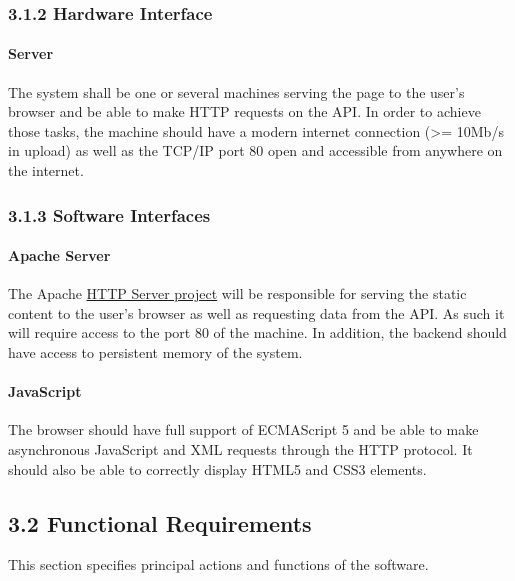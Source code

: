 \documentclass[]{article}
\begin{document}
\subsubsection{3.1.2 Hardware Interface}\label{hardware-interface}

\paragraph{Server}\label{server}

The system shall be one or several machines serving the page to the
user's browser and be able to make HTTP requests on the API. In order to
achieve those tasks, the machine should have a modern internet
connection (\textgreater{}= 10Mb/s in upload) as well as the TCP/IP port
80 open and accessible from anywhere on the internet.

\subsubsection{3.1.3 Software Interfaces}\label{software-interfaces-1}

\paragraph{Apache Server}\label{apache-server}

The Apache \href{http://httpd.apache.org/}{HTTP Server project} will be
responsible for serving the static content to the user's browser as well
as requesting data from the API. As such it will require access to the
port 80 of the machine. In addition, the backend should have access to
persistent memory of the system.

\paragraph{JavaScript}\label{javascript}

The browser should have full support of ECMAScript 5 and be able to make
asynchronous JavaScript and XML requests through the HTTP protocol. It
should also be able to correctly display HTML5 and CSS3 elements.

\subsection{3.2 Functional Requirements}\label{functional-requirements}

This section specifies principal actions and functions of the software.
\end{document}
